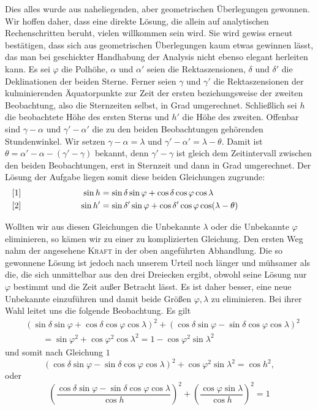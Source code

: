 Dies alles wurde aus naheliegenden, aber geometrischen Überlegungen gewonnen. Wir hoffen daher, dass eine direkte Lösung, die allein auf analytischen Rechenschritten beruht, vielen willkommen sein wird. Sie wird gewiss erneut bestätigen, dass sich aus geometrischen Überlegungen kaum etwas gewinnen lässt, das man bei geschickter Handhabung der Analysis nicht ebenso elegant herleiten kann.
\begingroup
\newcommand{\GaussVIPoliLabel}[3]{%
  \makebox[0pt][l]{[#2]}%
  \makebox[#1\linewidth][r]{$\displaystyle #3$}%
}
\newcommand{\GaussVIPoliAligned}[1]{%
  \[\makebox[\linewidth][l]{$\displaystyle\begin{aligned}#1\end{aligned}$}\]%
}
\newcommand{\GaussVIPoliSingle}[2]{%
  \[\makebox[\linewidth][l]{%
    \makebox[0pt][l]{[#1]}%
    \makebox[\linewidth][c]{$\displaystyle #2$}}\]%
}
Es sei $\varphi$ die Polhöhe, $\alpha$ und $\alpha'$ seien die Rektaszensionen, $\delta$ und $\delta'$ die Deklinationen der beiden Sterne. Ferner seien $\gamma$ und $\gamma'$ die Rektaszensionen der kulminierenden Äquatorpunkte zur Zeit der ersten beziehungsweise der zweiten Beobachtung, also die Sternzeiten selbst, in Grad umgerechnet. Schließlich sei $h$ die beobachtete Höhe des ersten Sterns und $h'$ die Höhe des zweiten. Offenbar sind $\gamma-\alpha$ und $\gamma'-\alpha'$ die zu den beiden Beobachtungen gehörenden Stundenwinkel. Wir setzen $\gamma-\alpha=\lambda$ und $\gamma'-\alpha'=\lambda-\theta$. Damit ist $\theta=\alpha'-\alpha-(\gamma'-\gamma)$ bekannt, denn $\gamma'-\gamma$ ist gleich dem Zeitintervall zwischen den beiden Beobachtungen, erst in Sternzeit und dann in Grad umgerechnet. Der Lösung der Aufgabe liegen somit diese beiden Gleichungen zugrunde:
\GaussVIPoliAligned{
\GaussVIPoliLabel{.30}{1}{\sin h}&=\sin\delta\sin\varphi+\cos\delta\cos\varphi\cos\lambda\\
\GaussVIPoliLabel{.30}{2}{\sin h'}&=\sin\delta'\sin\varphi+\cos\delta'\cos\varphi\cos(\lambda-\theta)
}
Wollten wir aus diesen Gleichungen die Unbekannte $\lambda$ oder die Unbekannte $\varphi$ eliminieren, so kämen wir zu einer zu komplizierten Gleichung. Den ersten Weg nahm der angesehene \textsc{Kraft} in der oben angeführten Abhandlung. Die so gewonnene Lösung ist jedoch nach unserem Urteil noch länger und mühsamer als die, die sich unmittelbar aus den drei Dreiecken ergibt, obwohl seine Lösung nur $\varphi$ bestimmt und die Zeit außer Betracht lässt. Es ist daher besser, eine neue Unbekannte einzuführen und damit beide Größen $\varphi,\lambda$ zu eliminieren. Bei ihrer Wahl leitet uns die folgende Beobachtung. Es gilt
\[
\begin{aligned}
&(\sin\delta\sin\varphi+\cos\delta\cos\varphi\cos\lambda)^2+(\cos\delta\sin\varphi-\sin\delta\cos\varphi\cos\lambda)^2\\
&\qquad=\sin\varphi^2+\cos\varphi^2\cos\lambda^2=1-\cos\varphi^2\sin\lambda^2
\end{aligned}
\]
und somit nach Gleichung $1$
\[
(\cos\delta\sin\varphi-\sin\delta\cos\varphi\cos\lambda)^2+\cos\varphi^2\sin\lambda^2=\cos h^2,
\]
oder
\[
\left(\frac{\cos\delta\sin\varphi-\sin\delta\cos\varphi\cos\lambda}{\cos h}\right)^2+\left(\frac{\cos\varphi\sin\lambda}{\cos h}\right)^2=1
\]

